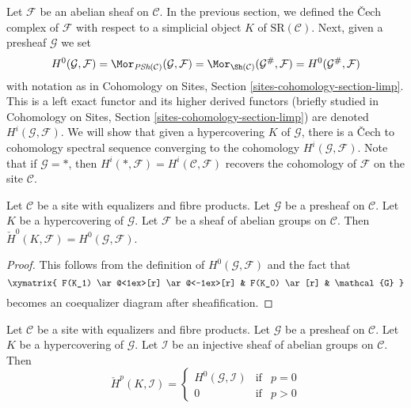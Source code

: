 \medskip\noindent
Let $\mathcal{F}$ be an abelian sheaf on $\mathcal{C}$.
In the previous section, we defined the {\v C}ech complex of $\mathcal{F}$
with respect to a simplicial object $K$ of $\text{SR}(\mathcal{C})$.
Next, given a presheaf $\mathcal{G}$ we set
$$
H^0(\mathcal{G}, \mathcal{F}) =
\Mor_{\textit{PSh}(\mathcal{C})}(\mathcal{G}, \mathcal{F}) =
\Mor_{\Sh(\mathcal{C})}(\mathcal{G}^\#, \mathcal{F}) =
H^0(\mathcal{G}^\#, \mathcal{F})
$$
with notation as in
Cohomology on Sites, Section \ref{sites-cohomology-section-limp}.
This is a left exact functor and its higher derived functors
(briefly studied in
Cohomology on Sites, Section \ref{sites-cohomology-section-limp})
are denoted $H^i(\mathcal{G}, \mathcal{F})$.
We will show that given a hypercovering $K$ of $\mathcal{G}$,
there is a {\v C}ech to cohomology spectral sequence converging to the
cohomology $H^i(\mathcal{G}, \mathcal{F})$.
Note that if $\mathcal{G} = *$, then
$H^i(*, \mathcal{F}) = H^i(\mathcal{C}, \mathcal{F})$ recovers
the cohomology of $\mathcal{F}$ on the site $\mathcal{C}$.

\begin{lemma}
\label{lemma-h0-cech-variant}
Let $\mathcal{C}$ be a site with equalizers and fibre products.
Let $\mathcal{G}$ be a presheaf on $\mathcal{C}$.
Let $K$ be a hypercovering of $\mathcal{G}$.
Let $\mathcal{F}$ be a sheaf of abelian groups on $\mathcal{C}$.
Then $\check{H}^0(K, \mathcal{F}) = H^0(\mathcal{G}, \mathcal{F})$.
\end{lemma}

\begin{proof}
This follows from the definition of $H^0(\mathcal{G}, \mathcal{F})$
and the fact that
$$
\xymatrix{
F(K_1) \ar@<1ex>[r] \ar@<-1ex>[r] &
F(K_0) \ar[r] & \mathcal{G}
}
$$
becomes an coequalizer diagram after sheafification.
\end{proof}

\begin{lemma}
\label{lemma-injective-trivial-cech-variant}
Let $\mathcal{C}$ be a site with equalizers and fibre products.
Let $\mathcal{G}$ be a presheaf on $\mathcal{C}$.
Let $K$ be a hypercovering of $\mathcal{G}$.
Let $\mathcal{I}$ be an injective sheaf of abelian groups on $\mathcal{C}$.
Then
$$
\check{H}^p(K, \mathcal{I}) =
\left\{
\begin{matrix}
H^0(\mathcal{G}, \mathcal{I}) & \text{if} & p = 0 \\
0 & \text{if} & p > 0
\end{matrix}
\right.
$$
\end{lemma}

